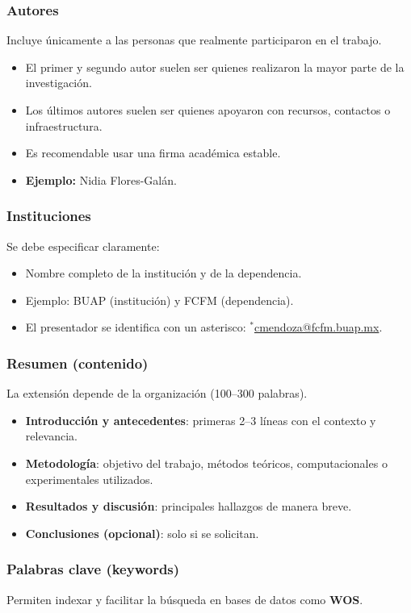 \documentclass{article}
\begin{document}
\subsubsection{Autores}  
Incluye únicamente a las personas que realmente participaron en el trabajo.  
\begin{itemize}
	\item El primer y segundo autor suelen ser quienes realizaron la mayor parte de la investigación.  
	\item Los últimos autores suelen ser quienes apoyaron con recursos, contactos o infraestructura.  
	\item Es recomendable usar una firma académica estable.  
	\item \textbf{Ejemplo:} Nidia Flores-Galán.
\end{itemize}

\subsubsection{Instituciones}  
Se debe especificar claramente:  
\begin{itemize}
	\item Nombre completo de la institución y de la dependencia.  
	\item Ejemplo: BUAP (institución) y FCFM (dependencia).  
	\item El presentador se identifica con un asterisco:  
	\href{cmendoza@fcfm.buap.mx}{$^{\ast}$cmendoza@fcfm.buap.mx}.
\end{itemize}

\subsubsection{Resumen (contenido)}  
La extensión depende de la organización (100–300 palabras).  

\begin{itemize}
	\item \textbf{Introducción y antecedentes}: primeras 2–3 líneas con el contexto y relevancia.  
	\item \textbf{Metodología}: objetivo del trabajo, métodos teóricos, computacionales o experimentales utilizados.  
	\item \textbf{Resultados y discusión}: principales hallazgos de manera breve.  
	\item \textbf{Conclusiones (opcional)}: solo si se solicitan.  
\end{itemize}

\subsubsection{Palabras clave (keywords)}  
Permiten indexar y facilitar la búsqueda en bases de datos como \textbf{WOS}.  
\end{document}
